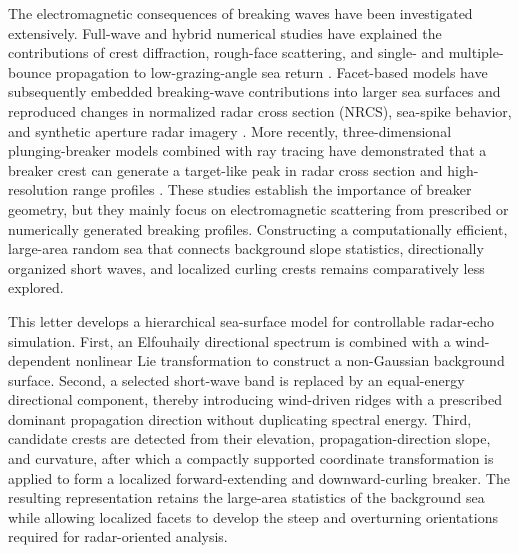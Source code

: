 The electromagnetic consequences of breaking waves have been investigated extensively. Full-wave and hybrid numerical studies have explained the contributions of crest diffraction, rough-face scattering, and single- and multiple-bounce propagation to low-grazing-angle sea return \cite{west1998mmgtd,west1999ray,west2002plunging,west2002multipath,zhao2005spilling,yang2011breaking}. Facet-based models have subsequently embedded breaking-wave contributions into larger sea surfaces and reproduced changes in normalized radar cross section (NRCS), sea-spike behavior, and synthetic aperture radar imagery \cite{li2017facet}. More recently, three-dimensional plunging-breaker models combined with ray tracing have demonstrated that a breaker crest can generate a target-like peak in radar cross section and high-resolution range profiles \cite{dong2023plunging}. These studies establish the importance of breaker geometry, but they mainly focus on electromagnetic scattering from prescribed or numerically generated breaking profiles. Constructing a computationally efficient, large-area random sea that connects background slope statistics, directionally organized short waves, and localized curling crests remains comparatively less explored.

This letter develops a hierarchical sea-surface model for controllable radar-echo simulation. First, an Elfouhaily directional spectrum is combined with a wind-dependent nonlinear Lie transformation to construct a non-Gaussian background surface. Second, a selected short-wave band is replaced by an equal-energy directional component, thereby introducing wind-driven ridges with a prescribed dominant propagation direction without duplicating spectral energy. Third, candidate crests are detected from their elevation, propagation-direction slope, and curvature, after which a compactly supported coordinate transformation is applied to form a localized forward-extending and downward-curling breaker. The resulting representation retains the large-area statistics of the background sea while allowing localized facets to develop the steep and overturning orientations required for radar-oriented analysis.

